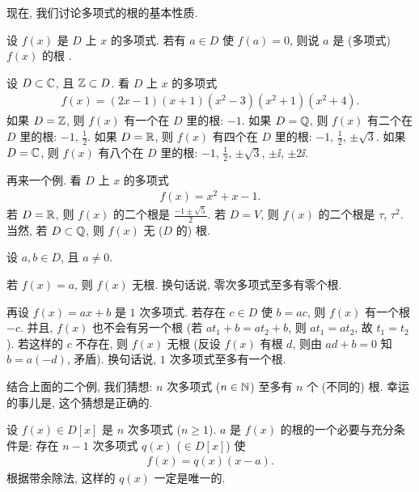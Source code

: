 现在, 我们讨论多项式的根的基本性质.

\begin{definition}
    设 $f(x)$ 是 $D$ 上 $x$ 的多项式. 若有 $a \in D$ 使 $f(a) = 0$, 则说 $a$ 是 (多项式) $f(x)$ 的根 .
\end{definition}

\begin{example}
    设 $D \subset \mathbb{C}$, 且 $\mathbb{Z} \subset D$. 看 $D$ 上 $x$ 的多项式
    \begin{align*}
        f(x) = (2x-1)(x+1)(x^2 - 3)(x^2 + 1)(x^2 + 4).
    \end{align*}
    如果 $D = \mathbb{Z}$, 则 $f(x)$ 有一个在 $D$ 里的根: $-1$. 如果 $D = \mathbb{Q}$, 则 $f(x)$ 有二个在 $D$ 里的根: $-1$, $\frac12$. 如果 $D = \mathbb{R}$, 则 $f(x)$ 有四个在 $D$ 里的根: $-1$, $\frac12$, $\pm \sqrt{3}$. 如果 $D = \mathbb{C}$, 则 $f(x)$ 有八个在 $D$ 里的根: $-1$, $\frac12$, $\pm \sqrt{3}$, $\pm \ii$, $\pm 2\ii$.
\end{example}

\begin{example}
    再来一个例. 看 $D$ 上 $x$ 的多项式
    \begin{align*}
        f(x) = x^2 + x - 1.
    \end{align*}
    若 $D = \mathbb{R}$, 则 $f(x)$ 的二个根是 $\frac{-1 \pm \sqrt{5}}{2}$. 若 $D = V$, 则 $f(x)$ 的二个根是 $\tau$, $\tau^2$. 当然, 若 $D \subset \mathbb{Q}$, 则 $f(x)$ 无 ($D$ 的) 根.
\end{example}

\begin{remark}
    设 $a,b \in D$, 且 $a \neq 0$.

    若 $f(x) = a$, 则 $f(x)$ 无根. 换句话说, 零次多项式至多有零个根.

    再设 $f(x) = ax + b$ 是 $1$ 次多项式. 若存在 $c \in D$ 使 $b = ac$, 则 $f(x)$ 有一个根 $-c$. 并且, $f(x)$ 也不会有另一个根 (若 $at_1 + b = at_2 + b$, 则 $at_1 = at_2$, 故 $t_1 = t_2$). 若这样的 $c$ 不存在, 则 $f(x)$ 无根 (反设 $f(x)$ 有根 $d$, 则由 $ad + b = 0$ 知 $b = a(-d)$, 矛盾). 换句话说, $1$ 次多项式至多有一个根.

    结合上面的二个例, 我们猜想: $n$ 次多项式 ($n \in \mathbb{N}$) 至多有 $n$ 个 (不同的) 根. 幸运的事儿是, 这个猜想是正确的.
\end{remark}

\begin{proposition}
    设 $f(x) \in D[x]$ 是 $n$ 次多项式 ($n \geq 1$). $a$ 是 $f(x)$ 的根的一个必要与充分条件是: 存在 $n-1$ 次多项式 $q(x)$ ($\in D[x]$) 使
    \begin{align*}
        f(x) = q(x) (x-a).
    \end{align*}
    根据带余除法, 这样的 $q(x)$ 一定是唯一的.
\end{proposition}

